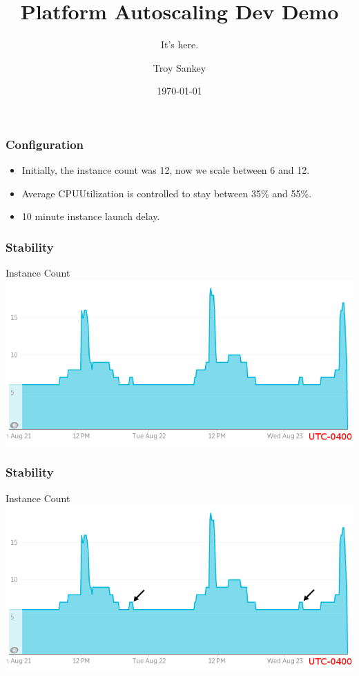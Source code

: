 \documentclass{beamer}
\title{Platform Autoscaling Dev Demo}
\subtitle{It's here.}
\author{Troy Sankey}
\date{\today}
\begin{document}
\begin{frame}
\titlepage
\end{frame}

\begin{frame}
\frametitle{Configuration}
\begin{itemize}
\item Initially, the instance count was 12, now we scale between 6 and 12.
\item Average CPUUtilization is controlled to stay between 35\% and 55\%.
\item 10 minute instance launch delay.
\end{itemize}
\end{frame}

\begin{frame}
\frametitle{Stability}
\begin{center}
Instance Count
\includegraphics[width=\textwidth]{instance_count.png}
\end{center}
\end{frame}

\begin{frame}
\frametitle{Stability}
\begin{center}
Instance Count
\includegraphics[width=\textwidth]{instance_count_arrows.png}
\end{center}
\end{frame}
\end{document}
